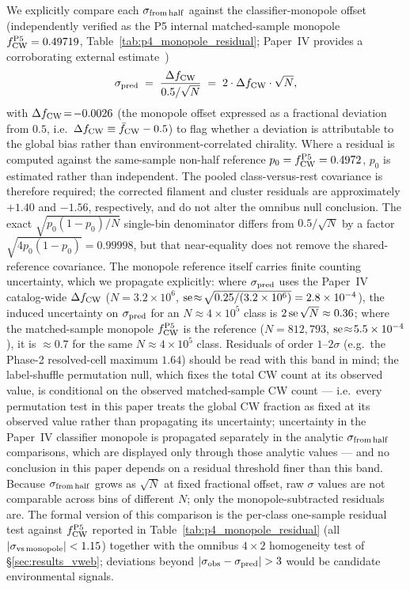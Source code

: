 \documentclass[twocolumn,linenumbers]{aastex702}
\begin{document}
We explicitly compare each $\sigma_{\rm from\,half}$ against the
classifier-monopole offset (independently verified as the P5 internal
matched-sample monopole $f_{\rm CW}^{\rm P5} = 0.49719$,
Table~\ref{tab:p4_monopole_residual}; Paper~IV provides a corroborating
external estimate~\cite{golden_chirality_2026})
\begin{equation}\label{eq:sigma_pred}
\sigma_{\rm pred} \;=\; \frac{\Delta f_{\rm CW}}{0.5 / \sqrt{N}}
\;=\; 2 \cdot \Delta f_{\rm CW} \cdot \sqrt{N},
\end{equation}
with $\Delta f_{\rm CW}\!=\!-0.0026$ (the monopole offset expressed as
a fractional deviation from $0.5$, i.e.\
$\Delta f_{\rm CW} \equiv \bar f_{\rm CW} - 0.5$) to flag whether a
deviation is attributable to the global bias rather than
environment-correlated chirality. Where a residual is computed against the
same-sample non-half reference $p_0=f_{\rm CW}^{\rm P5}=0.4972$, $p_0$
is estimated rather than independent. The pooled class-versus-rest covariance
is therefore required; the corrected filament and cluster residuals are
approximately $+1.40$ and $-1.56$, respectively, and do not alter the
omnibus null conclusion. The exact $\sqrt{p_0(1-p_0)/N}$ single-bin
denominator differs from $0.5/\sqrt{N}$ by a factor
$\sqrt{4p_0(1-p_0)}=0.99998$, but that near-equality does not remove
the shared-reference covariance. The monopole reference itself carries finite counting
uncertainty, which we propagate explicitly: where $\sigma_{\rm pred}$
uses the Paper~IV catalog-wide $\Delta f_{\rm CW}$
($N\!=\!3.2\times10^6$, ${\rm se}\!\approx\!\sqrt{0.25/(3.2\times10^6)}
= 2.8\times10^{-4}$), the induced uncertainty on $\sigma_{\rm pred}$
for an $N\!\approx\!4\times10^5$ class is $2\,{\rm se}\,\sqrt{N}
\approx 0.36$; where the matched-sample monopole $f_{\rm CW}^{\rm P5}$
is the reference ($N\!=\!812{,}793$, ${\rm se}\!\approx\!5.5\times
10^{-4}$), it is $\approx 0.7$ for the same $N\!\approx\!4\times10^5$
class. Residuals of order $1$--$2\sigma$
(e.g.\ the Phase-2 resolved-cell maximum $1.64$) should be read with this band in
mind; the label-shuffle permutation null, which fixes the total CW
count at its observed value, is conditional on the observed matched-sample
CW count --- i.e.\ every permutation test in this
paper treats the global CW fraction as fixed at its observed value rather
than propagating its uncertainty; uncertainty in the Paper~IV classifier
monopole is propagated separately in the analytic $\sigma_{\rm from\,half}$ comparisons, which are displayed only
through those analytic values --- and no
conclusion in this paper depends
on a residual threshold finer than this band. Because
$\sigma_{\rm from\,half}$ grows as $\sqrt{N}$ at
fixed fractional offset, raw $\sigma$ values are not comparable across
bins of different $N$; only the monopole-subtracted residuals are.
The formal version of this comparison is the per-class one-sample
residual test against $f_{\rm CW}^{\rm P5}$ reported in
Table~\ref{tab:p4_monopole_residual} (all $|\sigma_{\rm vs\,monopole}|
< 1.15$) together with the omnibus $4\times2$ homogeneity test of
\S\ref{sec:results_vweb}; deviations beyond
$|\sigma_{\rm obs} - \sigma_{\rm pred}| > 3$ would be candidate
environmental signals.
\end{document}
